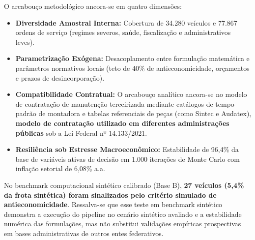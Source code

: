 O arcabouço metodológico ancora-se em quatro dimensões:
\begin{itemize}
    \item \textbf{Diversidade Amostral Interna:} Cobertura de 34.280 veículos e 77.867 ordens de serviço (regimes severos, saúde, fiscalização e administrativos leves).
    \item \textbf{Parametrização Exógena:} Desacoplamento entre formulação matemática e parâmetros normativos locais (teto de 40\% de antieconomicidade, orçamentos e prazos de desincorporação).
    \item \textbf{Compatibilidade Contratual:} O arcabouço analítico ancora-se no modelo de contratação de manutenção terceirizada mediante catálogos de tempo-padrão de montadora e tabelas referenciais de peças (como Sintec e Audatex), \textbf{modelo de contratação utilizado em diferentes administrações públicas} sob a Lei Federal nº 14.133/2021.
    \item \textbf{Resiliência sob Estresse Macroeconômico:} Estabilidade de 96,4\% da base de variáveis ativas de decisão em 1.000 iterações de Monte Carlo com inflação setorial de 6,08\% a.a.
\end{itemize}

No benchmark computacional sintético calibrado (Base B), \textbf{27 veículos (5,4\% da frota sintética) foram sinalizados pelo critério simulado de antieconomicidade}. Ressalva-se que esse teste em benchmark sintético demonstra a execução do pipeline no cenário sintético avaliado e a estabilidade numérica das formulações, mas não substitui validações empíricas prospectivas em bases administrativas de outros entes federativos.
